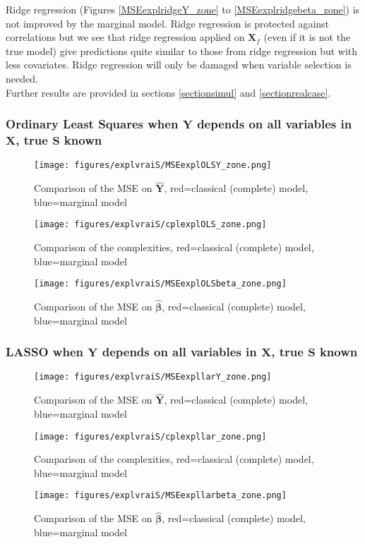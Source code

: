 \documentclass[12pt,a4paper]{report}
\begin{document}
Ridge regression (Figures \ref{MSEexplridgeY_zone} to \ref{MSEexplridgebeta_zone}) is not improved by the marginal model. Ridge regression is protected against correlations but we see that ridge regression applied on $\boldsymbol{X}_f$ (even if it is not the true model) give predictions quite similar to those from ridge regression but with less covariates. Ridge regression will only be damaged when variable selection is needed. \\

Further results are provided in sections \ref{sectionsimul} and \ref{sectionrealcase}.
	\FloatBarrier

\newpage
\subsubsection{Ordinary Least Squares when $\boldsymbol{Y}$ depends on all variables in $\boldsymbol{X}$, true $\boldsymbol{S}$ known}

	\begin{figure}[h!]
	\centering
		  \texttt{[image: figures/explvraiS/MSEexplOLSY\_zone.png]}
		\caption{Comparison of the MSE on $\hat{\boldsymbol{Y}}$, red=classical (complete) model, blue=marginal model}\label{MSEexplOLSY_zone}
	\end{figure}
	\begin{figure}[h!]
	\centering
		  \texttt{[image: figures/explvraiS/cplexplOLS\_zone.png]}
		\caption{Comparison of the complexities, red=classical (complete) model, blue=marginal model}\label{cplexplOLS_zone}
	\end{figure}
	\begin{figure}[h!]
	\centering
		  \texttt{[image: figures/explvraiS/MSEexplOLSbeta\_zone.png]}
		\caption{Comparison of the MSE on $\hat{\boldsymbol{\beta}}$, red=classical (complete) model, blue=marginal model}\label{MSEexplOLSbeta_zone}
	\end{figure}
	\FloatBarrier
\newpage
\subsubsection{LASSO when $\boldsymbol{Y}$ depends on all variables in $\boldsymbol{X}$, true $\boldsymbol{S}$ known}
	\begin{figure}[h!]
	\centering
		  \texttt{[image: figures/explvraiS/MSEexpllarY\_zone.png]}
		\caption{Comparison of the MSE on $\hat{\boldsymbol{Y}}$, red=classical (complete) model, blue=marginal model}\label{MSEexpllarY_zone}
	\end{figure}
	\begin{figure}[h!]
	\centering
		  \texttt{[image: figures/explvraiS/cplexpllar\_zone.png]}
		\caption{Comparison of the complexities, red=classical (complete) model, blue=marginal model}\label{cplexpllar_zone}
	\end{figure}
	\begin{figure}[h!]
	\centering
		  \texttt{[image: figures/explvraiS/MSEexpllarbeta\_zone.png]}
		\caption{Comparison of the MSE on $\hat{\boldsymbol{\beta}}$, red=classical (complete) model, blue=marginal model}\label{MSEexpllarbeta_zone}
	\end{figure}
	\FloatBarrier
\newpage
\end{document}
